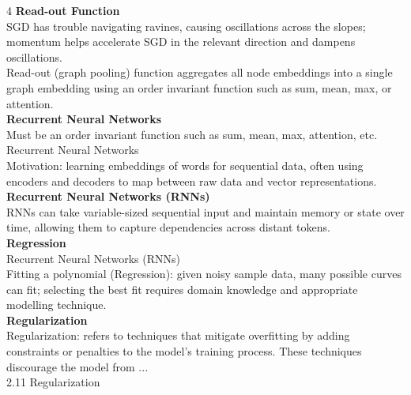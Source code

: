 \documentclass[8pt]{extarticle}
\begin{document}
\begin{multicols}{4}
\vspace{2pt}\textbf{Read-out Function}\\
SGD has trouble navigating ravines, causing oscillations across the slopes; momentum helps accelerate SGD in the relevant direction and dampens oscillations.\\
Read-out (graph pooling) function aggregates all node embeddings into a single graph embedding using an order invariant function such as sum, mean, max, or attention.\\
\vspace{2pt}\textbf{Recurrent Neural Networks}\\
Must be an order invariant function such as sum, mean, max, attention, etc.\\
Recurrent Neural Networks\\
Motivation: learning embeddings of words for sequential data, often using encoders and decoders to map between raw data and vector representations.\\
\vspace{2pt}\textbf{Recurrent Neural Networks (RNNs)}\\
RNNs can take variable-sized sequential input and maintain memory or state over time, allowing them to capture dependencies across distant tokens.\\
\vspace{2pt}\textbf{Regression}\\
Recurrent Neural Networks (RNNs)\\
Fitting a polynomial (Regression): given noisy sample data, many possible curves can fit; selecting the best fit requires domain knowledge and appropriate modelling technique.\\
\vspace{2pt}\textbf{Regularization}\\
Regularization: refers to techniques that mitigate overfitting by adding constraints or penalties to the model's training process. These techniques discourage the model from ...\\
2.11 Regularization\\


\end{multicols}
\end{document}
